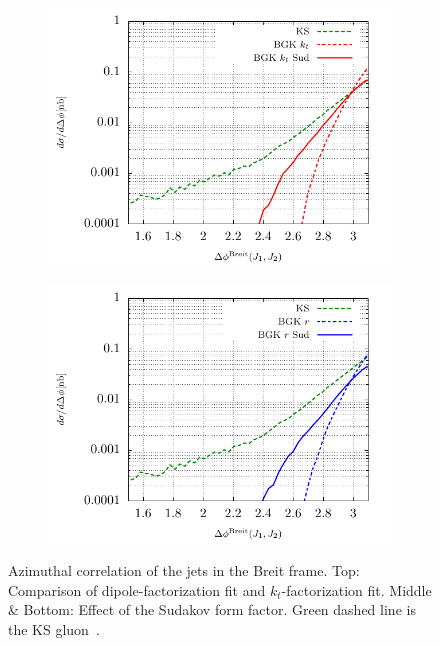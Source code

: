 \documentclass[12pt]{article}
\numberwithin{equation}{section}
\numberwithin{table}{section}
\numberwithin{figure}{section}
\begin{document}
\begin{figure}[p]
	\begin{subfigure}{0.5\textwidth}
		\includegraphics[width=\textwidth]{plots/plotBGK2Jets}
	\end{subfigure}
	\begin{subfigure}{0.5\textwidth}
		\includegraphics[width=\textwidth]{plots/plotBGK3Jets}
	\end{subfigure}
\caption{\footnotesize Azimuthal correlation of the jets in the Breit frame. Top: Comparison of dipole-factorization fit and $k_t$-factorization fit. Middle \& Bottom: Effect of the Sudakov form factor. Green dashed line is the KS gluon~\cite{vanHameren:2021sqc}. }
\label{fig:jj-breit}
\end{figure}
\end{document}
